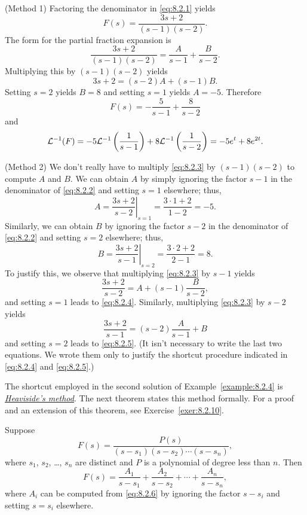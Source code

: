 \begin{examplesolution}
\solution ({\sc Method 1}) Factoring the denominator in \eqref{eq:8.2.1} yields
\begin{equation}
  \label{eq:8.2.2}F(s)=\frac{3s+2}{(s-1)(s-2)}.
\end{equation}
The form for the partial fraction expansion is
\begin{equation}
  \label{eq:8.2.3}\frac{3s+2}{(s-1)(s-2)}=\frac{A}{s-1}+\frac{B}{s-2}.
\end{equation}
Multiplying this by $(s-1)(s-2)$ yields
\[
  3s+2=(s-2)A+(s-1)B.
\]
Setting $s=2$ yields $B=8$ and setting $s=1$ yields $A=-5$. Therefore
\[
  F(s)=-\frac{5}{s-1}+\frac{8}{s-2}
\]
and
\[
  {\cal L}^{-1}(F)=-5{\cal L}^{-1}\left(\frac{1}{s-1}\right) +8{\cal L}^{-1}\left(\frac{1}{s-2}\right)=-5e^{t}+8e^{2t}.
\]

\solution ({\sc Method 2}) We don't really have to multiply \eqref{eq:8.2.3} by $(s-1)(s-2)$ to
compute $A$ and $B$. We can obtain $A$ by simply ignoring the factor $s-1$ in the denominator of
\eqref{eq:8.2.2} and setting $s=1$ elsewhere; thus,
\begin{equation}
  \label{eq:8.2.4}A=\left.\frac{3s+2}{s-2}\right|_{s=1}=\frac{3\cdot1+2}{1-2}=-5.
\end{equation}
Similarly, we can obtain $B$ by ignoring the factor $s-2$ in the denominator of \eqref{eq:8.2.2} and
setting $s=2$ elsewhere; thus,
\begin{equation}
  \label{eq:8.2.5}B=\left.\frac{3s+2}{s-1}\right|_{s=2}=\frac{3\cdot2+2}{2-1}=8.
\end{equation}
To justify this, we observe that multiplying \eqref{eq:8.2.3} by $s-1$ yields
\[
  \frac{3s+2}{s-2}=A+(s-1)\frac{B}{s-2},
\]
and setting $s=1$ leads to \eqref{eq:8.2.4}. Similarly, multiplying \eqref{eq:8.2.3} by $s-2$ yields
\[
  \frac{3s+2}{s-1}=(s-2)\frac{A}{s-1}+B
\]
and setting $s=2$ leads to \eqref{eq:8.2.5}. (It isn't necessary to write the last two equations. We
wrote them only to justify the shortcut procedure indicated in \eqref{eq:8.2.4} and
\eqref{eq:8.2.5}.) \bbox
\end{examplesolution}

The shortcut employed in the second solution of Example~\ref{example:8.2.4} is
\href{https://mathshistory.st-andrews.ac.uk/Biographies/Heaviside/}{\color{blue}
\it Heaviside's method}. The next theorem states this method formally. For a proof and an extension
of this theorem, see Exercise~\ref{exer:8.2.10}.

\begin{theorem}
  \color{blue}
  \label{thmtype:8.2.2} Suppose
  \begin{equation}
    \label{eq:8.2.6}F(s)=\frac{P(s)}{(s-s_{1})(s-s_{2})\cdots(s-s_{n})},
  \end{equation}
  where $s_{1}$, $s_{2}$, \dots, $s_{n}$ are distinct and $P$ is a polynomial of degree less than
  $n$. Then
  \[
    F(s)=\frac{A_{1}}{s-s_{1}}+\frac{A_{2}}{s-s_{2}}+\cdots+\frac{A_{n}}{s-s_{n}},
  \]
  where $A_{i}$ can be computed from \eqref{eq:8.2.6} by ignoring the factor $s-s_{i}$ and setting
  $s=s_{i}$ elsewhere.
\end{theorem}

